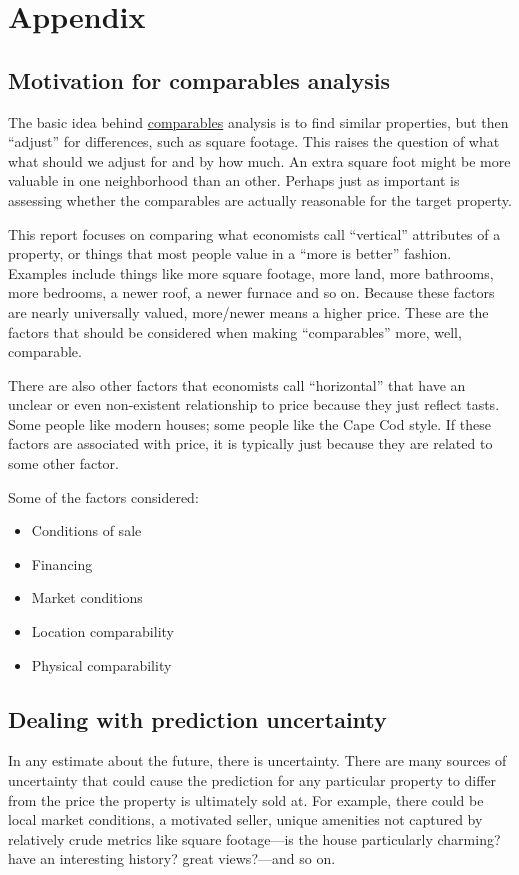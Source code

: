 \documentclass[
12pt, %
letterpaper, %
oneside, %
headinclude,footinclude, %
BCOR5mm, %
]{scrartcl}
\begin{document}
\section{Appendix} 

\subsection{Motivation for comparables analysis} \label{sec:methods}
The basic idea behind \href{https://en.wikipedia.org/wiki/Comparables}{comparables} analysis is to find similar properties, but then ``adjust'' for differences, such as square footage.
This raises the question of what what should we adjust for and by how much.
An extra square foot might be more valuable in one neighborhood than an other. 
Perhaps just as important is assessing whether the comparables are actually reasonable for the target property. 

This report focuses on comparing what economists call ``vertical'' attributes of a property, or things that most people value in a ``more is better'' fashion.
Examples include things like more square footage, more land, more bathrooms, more bedrooms, a newer roof, a newer furnace and so on.
Because these factors are nearly universally valued, more/newer means a higher price.
These are the factors that should be considered when making ``comparables'' more, well, comparable. 

There are also other factors that economists call ``horizontal'' that have an unclear or even non-existent relationship to price because they just reflect tasts.  
Some people like modern houses; some people like the Cape Cod style.
If these factors are associated with price, it is typically just because they are related to some other factor.

Some of the factors considered: 
\begin{itemize}
\item Conditions of sale
\item Financing
\item Market conditions
\item Location comparability
\item Physical comparability 
\end{itemize}

\subsection{Dealing with prediction uncertainty}  \label{sec:bootstrapping} 
In any estimate about the future, there is uncertainty.
There are many sources of uncertainty that could cause the prediction for any particular property to differ from the price the property is ultimately sold at.
For example, there could be local market conditions, a motivated seller, unique amenities not captured by relatively crude metrics like square footage---is the house particularly charming? have an interesting history? great views?---and so on. 
\end{document}
